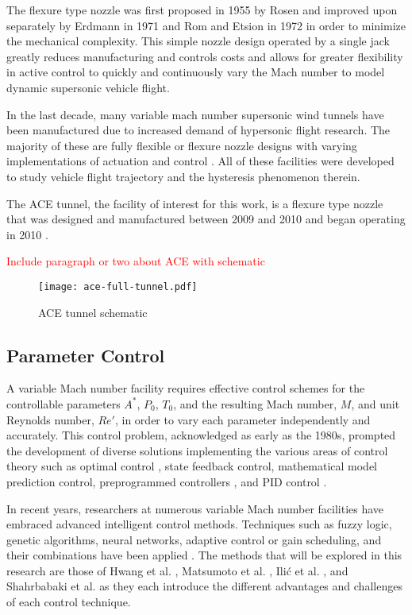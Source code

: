 The flexure type nozzle was first proposed in 1955 by Rosen \cite{rosen} and improved upon separately by Erdmann in 1971\cite{erdmann} and Rom and Etsion in 1972 \cite{erdmann,rom} in order to minimize the mechanical complexity. This simple nozzle design operated by a single jack greatly reduces manufacturing and controls costs and allows for greater flexibility in active control to quickly and continuously vary the Mach number to model dynamic supersonic vehicle flight.

In the last decade, many variable mach number supersonic wind tunnels have been manufactured due to increased demand of hypersonic flight research. The majority of these are fully flexible or flexure nozzle designs with varying implementations of actuation and control \cite{ilic-1,shahrbabaki-1,durand,laguarda,chen,guo,lv,qi,steeves}. All of these facilities were developed to study vehicle flight trajectory and the hysteresis phenomenon therein.

The ACE tunnel, the facility of interest for this work, is a flexure type nozzle that was designed and manufactured between 2009 and 2010 and began operating in 2010 \cite{ace09,ace10-calibrate,tichenor-dis}. 

\textcolor{red}{Include paragraph or two about ACE with schematic}

\begin{figure}[ht]
    \centering
    \texttt{[image: ace-full-tunnel.pdf]}
    \caption{ACE tunnel schematic}
    \label{fig:ace-full-tunnel}
\end{figure}

\subsection{Parameter Control}
A variable Mach number facility requires effective control schemes for the controllable parameters $A^*$, $P_0$, $T_0$, and the resulting Mach number, $M$, and unit Reynolds number, $Re'$, in order to vary each parameter independently and accurately. This control problem, acknowledged as early as the 1980s, prompted the development of diverse solutions implementing the various areas of control theory such as optimal control \cite{kraft,hwang}, state feedback control, mathematical model prediction control, preprogrammed controllers \cite{matsumoto}, and PID control \cite{fung,ilic-2,silva}.

In recent years, researchers at numerous variable Mach number facilities have embraced advanced intelligent control methods. Techniques such as fuzzy logic, genetic algorithms, neural networks, adaptive control or gain scheduling, and their combinations have been applied \cite{nott,shahrbabaki-1}. The methods that will be explored in this research are those of Hwang et al. \cite{hwang}, Matsumoto et al. \cite{matsumoto}, Ili\'c et al. \cite{ilic-2}, and Shahrbabaki et al. \cite{shahrbabaki-1} as they each introduce the different advantages and challenges of each control technique. 

